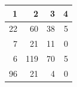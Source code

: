 \begin{tabular}{rrrr}
\toprule
1 & 2 & 3 & 4 \\
\midrule
22 & 60 & 38 & 5 \\
7 & 21 & 11 & 0 \\
6 & 119 & 70 & 5 \\
96 & 21 & 4 & 0 \\
\bottomrule
\end{tabular}
